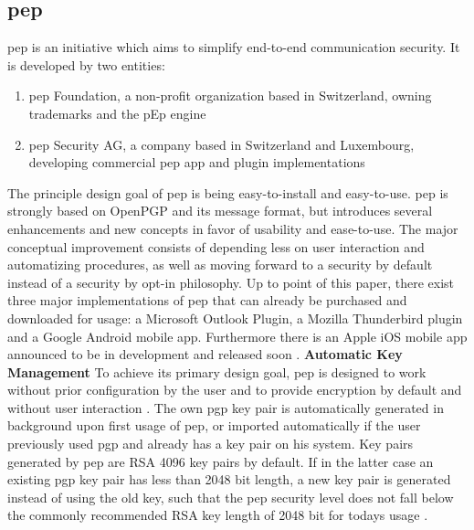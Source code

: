 \subsection{\acrlong{pep}}
\label{chap:analysis-pep}
\acrfull{pep} is an initiative which aims to simplify end-to-end communication security. It is developed by two entities:
\vspace{-5pt}
\begin{enumerate}
	\item \acrshort{pep} Foundation, a non-profit organization based in Switzerland, owning trademarks and the pEp engine
	\item \acrshort{pep} Security AG, a company based in Switzerland and Luxembourg, developing commercial \acrshort{pep} app and plugin implementations
\end{enumerate}
\vspace{-5pt}
The principle design goal of \acrshort{pep} is being easy-to-install and easy-to-use. \acrshort{pep} is strongly based on OpenPGP and its message format, but introduces several enhancements and new concepts in favor of usability and ease-to-use. The major conceptual improvement consists of depending less on user interaction and automatizing procedures, as well as moving forward to a security by
default instead of a security by opt-in philosophy. Up to point of this paper, there exist three major implementations of \acrshort{pep} that can already be
purchased and downloaded for usage: a Microsoft Outlook Plugin, a Mozilla Thunderbird plugin and a Google Android mobile app. Furthermore there is an Apple iOS mobile app announced to be in development and released soon \cite{pep-whitepaper}.
\newline
\newline
\textbf{Automatic Key Management}\newline
To achieve its primary design goal, \acrshort{pep} is designed to work without prior configuration by the user and to provide encryption by default and without user interaction \cite{pep-whitepaper}. The own \acrshort{pgp} key pair is automatically generated in background upon first usage of \acrshort{pep}, or imported automatically if the user previously used \acrshort{pgp} and already has a key pair on his system. Key pairs generated by \acrshort{pep} are RSA 4096 key pairs by default. If in the latter case an existing \acrshort{pgp} key pair has less than 2048 bit length, a new key pair is generated instead of using the old key, such that the \acrshort{pep} security level does not fall below the commonly recommended RSA key length of 2048 bit for todays usage \cite{pep-email-format-protocols}.
